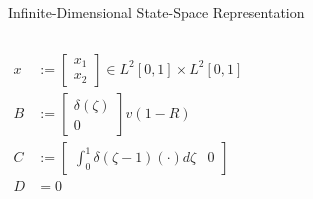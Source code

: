 \documentclass[8pt]{beamer}
\begin{document}
\begin{frame}{Infinite-Dimensional State-Space Representation}
\begin{columns}[c]
\begin{equation} \label{eq:operator_B_C_D}
    \begin{aligned}
        x &:= \begin{bmatrix} x_1 \\ x_2 \end{bmatrix} \in L^2[0,1] \times L^2[0,1]\\[6mm]
        B &:=
        \begin{bmatrix}
            \delta(\zeta) \\
            0
        \end{bmatrix} v(1-R) \\[3mm]
        C &:=
        \begin{bmatrix}
            \int_0^1 \delta(\zeta-1) (\cdot) d\zeta & 0
        \end{bmatrix} \\[3mm]
        D &= 0
    \end{aligned}
\end{equation}
\end{columns}
\end{frame}
\end{document}
